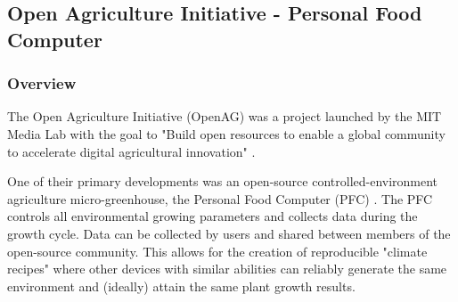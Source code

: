 \subsection{Open Agriculture Initiative - Personal Food Computer}



\subsubsection{Overview}

The Open Agriculture Initiative (OpenAG) was a project launched by the MIT Media Lab with the goal to "Build open resources to enable a global community to accelerate digital agricultural innovation" \cite{mit-openag}.

One of their primary developments was an open-source controlled-environment agriculture micro-greenhouse, the Personal Food Computer (PFC) \cite{mit-pfc}. The PFC controls all environmental growing parameters and collects data during the growth cycle.
Data can be collected by users and shared between members of the open-source community. This allows for the creation of reproducible "climate recipes" where other devices with similar abilities can reliably generate the same environment and (ideally) attain the same plant growth results.

